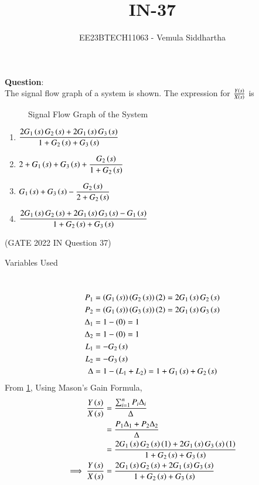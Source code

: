\documentclass[journal,12pt,twocolumn]{IEEEtran}
\theoremstyle{remark}
\begin{document}

\vspace{3cm}

\title{IN-37}
\author{EE23BTECH11063 - Vemula Siddhartha}
\maketitle
\newpage
\bigskip

\renewcommand{\thefigure}{\theenumi}
\renewcommand{\thetable}{\theenumi}
\textbf{Question}:\\
The signal flow graph of a system is shown. The expression for $\frac{Y\left(s\right)}{X\left(s\right)}$ is
\begin{figure}[h]
    \centering
    
    \caption{Signal Flow Graph of the System}
    \label{fig:sfg_in-37-2022}
\end{figure}
\begin{enumerate}[label=(\alph*)]
    \item $\dfrac{2 G_1\left(s\right) G_2\left(s\right) + 2 G_1\left(s\right) G_3\left(s\right) }{ 1 + G_2\left(s\right) + G_3\left(s\right) }$
    \item $ 2 + G_1\left(s\right) + G_3\left(s\right) + \dfrac{G_2\left(s\right) }{ 1 + G_2\left(s\right)}$
    \item $G_1\left(s\right) + G_3\left(s\right) - \dfrac{G_2\left(s\right) }{ 2 + G_2\left(s\right) }$
    \item $\dfrac{ 2 G_1\left(s\right) G_2\left(s\right) + 2 G_1\left(s\right) G_3\left(s\right) - G_1\left(s\right) }{ 1 + G_2\left(s\right) + G_3\left(s\right) }$
\end{enumerate}\hfill(GATE 2022 IN Question 37) \\
\solution
\begin{table}[h!]    
    \centering
    
    \caption{Variables Used}
  \end{table}\\
  \begin{align}
    P_1 &= \left(G_1\left(s\right)\right) \left(G_2\left(s\right)\right) \left(2\right) = 2 G_1\left(s\right) G_2\left(s\right) \\
    P_2 &= \left(G_1\left(s\right)\right) \left(G_3\left(s\right)\right) \left(2\right) = 2 G_1\left(s\right) G_3\left(s\right) \\
    \Delta_1 &= 1 - \left(0\right) = 1 \\
    \Delta_2 &= 1 - \left(0\right) = 1 \\
    L_1 &= -G_2\left(s\right) \\
    L_2 &= -G_3\left(s\right) \\
    \Delta &= 1 - \left(L_1 + L_2\right) = 1 + G_1\left(s\right) + G_2\left(s\right)
  \end{align}
  From \ref{fig:sfg_in-37-2022}, Using Mason's Gain Formula,
  \begin{align}
    \frac { Y\left(s\right) }{ X\left(s\right) } &= \frac { \sum_{ i = 1 }^{ n } P_i \Delta_i } { \Delta } \\
    &= \frac { P_1 \Delta_1 + P_2 \Delta_2 } { \Delta } \\
    &= \frac { 2 G_1\left(s\right) G_2 \left(s\right) \left(1\right) + 2 G_1\left(s\right) G_3\left(s\right) \left(1\right) } { 1 + G_2\left(s\right) + G_3\left(s\right) } \\
    \implies \frac { Y\left(s\right) }{ X\left(s\right) } &= \frac { 2 G_1\left(s\right) G_2\left(s\right) + 2 G_1\left(s\right) G_3\left(s\right) } { 1 + G_2\left(s\right) + G_3\left(s\right) }
  \end{align}
\end{document}
